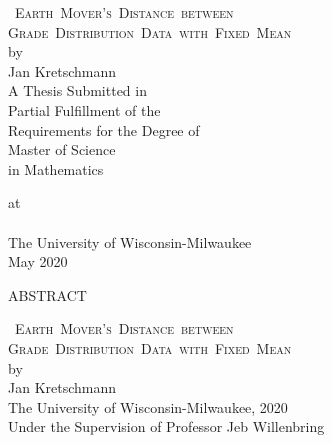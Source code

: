 \documentclass[12pt,letterpaper,oneside,openany]{book}
\newcommand{\name}{Jan Kretschmann}
\newcommand{\pglen}{390}
\newcommand{\pts}{12pt}
\newcommand{\vs}{\vspace{0.7cm}}
\newcommand{\mytitle}{\Large \textsc{\mbox{ Earth Mover's Distance between }\\
  \mbox{Grade Distribution Data with Fixed Mean}}\\[20pt] \normalsize by\\
  [20pt] \name  \\[\pts] \vs }
\begin{document}
\setlength{\baselineskip}{19pt}
\frontmatter




\doublespacing
{}

\pagestyle{plain}
\thispagestyle{empty}
\vs\vs 
\begin{center}
	\mytitle
	\singlespacing
	\vs
	A Thesis Submitted in \\
	Partial Fulfillment of the \\
	Requirements for the Degree of \\
	\vs \vs
	Master of Science  \\ %
	in 
	Mathematics 
	\vs \vs

	at\\
	 \ \\
	The University of Wisconsin-Milwaukee\\ 
	May 2020
\end{center}

\pagebreak



%

\begin{center} 
	{\large ABSTRACT} 
\end{center}
\begin{center}
	\mytitle  The University of Wisconsin-Milwaukee, 2020 \\
	Under the Supervision of Professor Jeb Willenbring 
\end{center}
\end{document}
